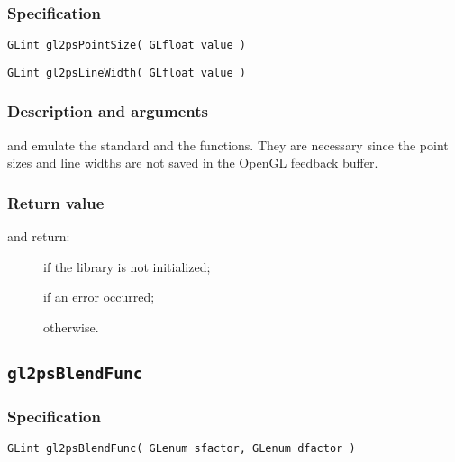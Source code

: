 \subsubsection{Specification}

\begin{verbatim}
GLint gl2psPointSize( GLfloat value )
\end{verbatim}

\begin{verbatim}
GLint gl2psLineWidth( GLfloat value )
\end{verbatim}

\subsubsection{Description and arguments}

 and  emulate the standard
 and the  functions. They are necessary
since the point sizes and line widths are not saved in the OpenGL feedback
buffer.

\subsubsection{Return value}

\noindent{} and  return:
\begin{description}
\item[] if the library is not initialized;
\item[] if an error occurred;
\item[] otherwise.
\end{description}


\subsection{\texttt{gl2psBlendFunc}}
\label{sec:gl2psBlendFunc}

\subsubsection{Specification}

\begin{verbatim}
GLint gl2psBlendFunc( GLenum sfactor, GLenum dfactor )
\end{verbatim}

